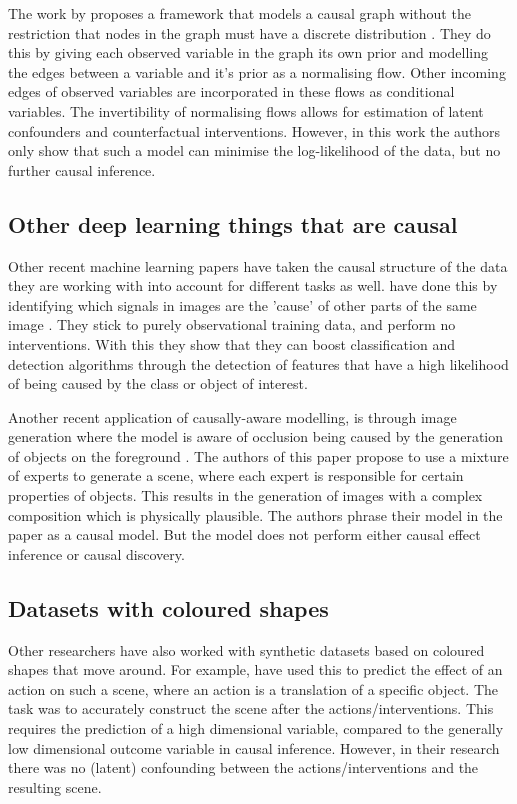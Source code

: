 \documentclass{report}
\begin{document}
The work by \textcite{parafita2020causal} proposes a framework that models a causal graph without the restriction that nodes in the graph must have a discrete distribution \parencite{parafita2020causal}. They do this by giving each observed variable in the graph its own prior and modelling the edges between a variable and it's prior as a normalising flow. Other incoming edges of observed variables are incorporated in these flows as conditional variables. The invertibility of normalising flows allows for estimation of latent confounders and counterfactual interventions. However, in this work the authors only show that such a model can minimise the log-likelihood of the data, but no further causal inference.
 
 \subsection{Other deep learning things that are causal}\label{section:rl_other}
 Other recent machine learning papers have taken the causal structure of the data they are working with into account for different tasks as well. \textcite{lopez2017discovering} have done this by identifying which signals in images are the 'cause' of other parts of the same image \parencite{lopez2017discovering}. They stick to purely observational training data, and perform no interventions. With this they show that they can boost classification and detection algorithms through the detection of features that have a high likelihood of being caused by the class or object of interest.
 
Another recent application of causally-aware modelling, is through image generation where the model is aware of occlusion being caused by the generation of objects on the foreground \parencite{von2020towards}. The authors of this paper propose to use a mixture of experts to generate a scene, where each expert is responsible for certain properties of objects. This results in the generation of images with a complex composition which is physically plausible. The authors phrase their model in the paper as a causal model. But the model does not perform either causal effect inference or causal discovery.

\subsection{Datasets with coloured shapes}\label{section:rl_coloured_shapes}
Other researchers have also worked with synthetic datasets based on coloured shapes that move around. For example, \textcite{kipf2019contrastive} have used this to predict the effect of an action on such a scene, where an action is a translation of a specific object. The task was to accurately construct the scene after the actions/interventions. This requires the prediction of a high dimensional variable, compared to the generally low dimensional outcome variable in causal inference. However, in their research there was no (latent) confounding between the actions/interventions and the resulting scene.
\end{document}
